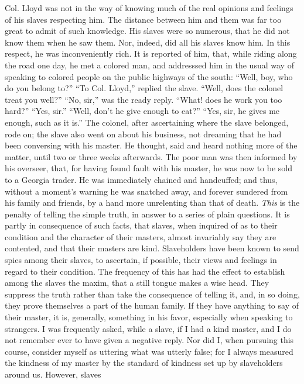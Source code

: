 Col. Lloyd was not in the way of knowing much of the real opinions and
feelings of his slaves respecting him. The distance between him and them
was far too great to admit of such knowledge. His slaves were so
numerous, that he did not know them when he saw them. Nor, indeed, did
all his slaves know him. In this respect, he was inconveniently rich. It
is reported of him, that, while riding along the road one day, he met a
colored man, and {addresssed} him in the usual way of speaking to
colored people on the public highways of the south: ``Well, boy, who do
you belong to?'' ``To Col. Lloyd,'' replied the slave. ``Well, does the
colonel treat you well?'' ``No, sir,'' was the ready reply. ``What! does
he work you too hard?'' ``Yes, sir.'' ``Well, don't he give enough to
eat?'' ``Yes, sir, he gives me enough, such as it is.'' The colonel,
after ascertaining where the slave belonged, rode on; the slave {}also
went on about his business, not dreaming that he had been conversing
with his master. He thought, said and heard nothing more of the matter,
until two or three weeks afterwards. The poor man was then informed by
his overseer, that, for having found fault with his master, he was now
to be sold to a Georgia trader. He was immediately chained and
handcuffed; and thus, without a moment's warning he was snatched away,
and forever sundered from his family and friends, by a hand more
unrelenting than that of death. \emph{This} is the penalty of telling
the simple truth, in answer to a series of plain questions. It is partly
in consequence of such facts, that slaves, when inquired of as to their
condition and the character of their masters, almost invariably say they
are contented, and that their masters are kind. Slaveholders have been
known to send spies among their slaves, to ascertain, if possible, their
views and feelings in regard to their condition. The frequency of this
has had the effect to establish among the slaves the maxim, that a still
tongue makes a wise head. They suppress the truth rather than take the
consequence of telling it, and, in so doing, they prove themselves a
part of the human family. If they have anything to say of their master,
it is, generally, something in his favor, especially when speaking to
strangers. I was frequently asked, while a slave, if I had a kind
master, and I do not remember ever to have given a negative reply. Nor
did I, when pursuing this course, consider myself as uttering what was
utterly false; for I always measured the kindness of my master by the
standard of {}kindness set up by slaveholders around us. However, slaves
